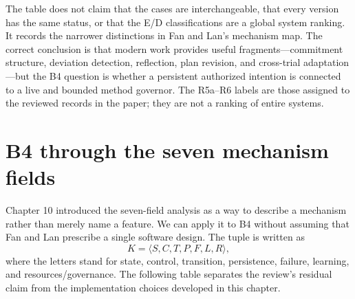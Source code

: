 The table does not claim that the cases are interchangeable, that every version has the same status, or that the E/D classifications are a global system ranking. It records the narrower distinctions in Fan and Lan's mechanism map. The correct conclusion is that modern work provides useful fragments—commitment structure, deviation detection, reflection, plan revision, and cross-trial adaptation—but the B4 question is whether a persistent authorized intention is connected to a live and bounded method governor. The R5a–R6 labels are those assigned to the reviewed records in the paper; they are not a ranking of entire systems.

\section{B4 through the seven mechanism fields}
\label{sec:ch15-seven-fields}

Chapter 10 introduced the seven-field analysis as a way to describe a mechanism rather than merely name a feature. We can apply it to B4 without assuming that Fan and Lan prescribe a single software design. The tuple is written as
\[
K = \langle S,C,T,P,F,L,R\rangle,
\]
where the letters stand for state, control, transition, persistence, failure, learning, and resources/governance. The following table separates the review's residual claim from the implementation choices developed in this chapter.

